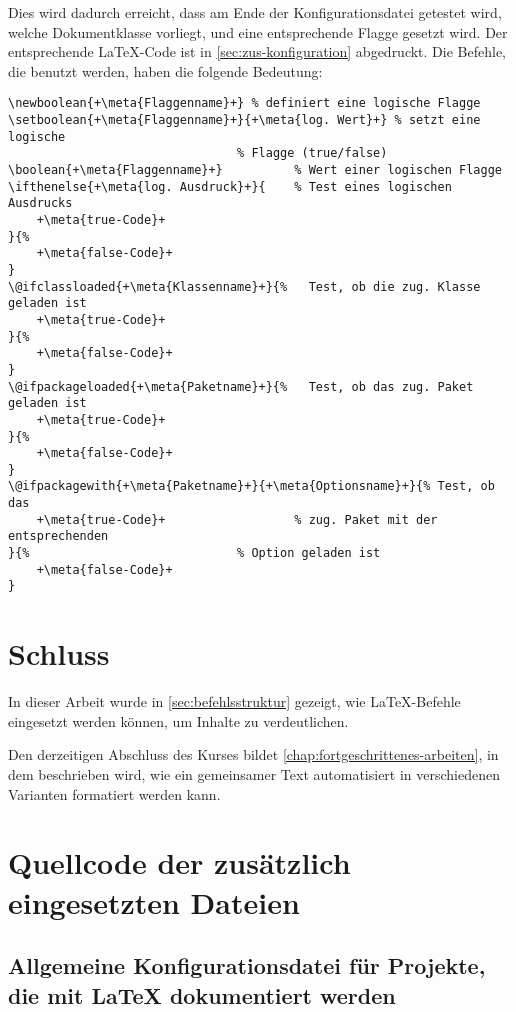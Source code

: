 \documentclass[ngerman,               %
               a4paper,               %
               fleqn,                 %
                     ]{scrartcl}       %
\begin{document}
Dies wird dadurch erreicht, dass am Ende der Konfigurationsdatei getestet
wird, welche Dokumentklasse vorliegt, und eine entsprechende Flagge gesetzt
wird. Der entsprechende \LaTeX-Code ist in \cref{sec:zus-konfiguration}
abgedruckt. Die Befehle, die benutzt werden, haben die folgende Bedeutung:
\begin{lstlisting}[escapechar=+]
\newboolean{+\meta{Flaggenname}+} % definiert eine logische Flagge
\setboolean{+\meta{Flaggenname}+}{+\meta{log. Wert}+} % setzt eine logische
                                % Flagge (true/false)
\boolean{+\meta{Flaggenname}+}          % Wert einer logischen Flagge
\ifthenelse{+\meta{log. Ausdruck}+}{    % Test eines logischen Ausdrucks
    +\meta{true-Code}+
}{%
    +\meta{false-Code}+
}
\@ifclassloaded{+\meta{Klassenname}+}{%   Test, ob die zug. Klasse geladen ist
    +\meta{true-Code}+
}{%
    +\meta{false-Code}+
}
\@ifpackageloaded{+\meta{Paketname}+}{%   Test, ob das zug. Paket geladen ist
    +\meta{true-Code}+
}{%
    +\meta{false-Code}+
}
\@ifpackagewith{+\meta{Paketname}+}{+\meta{Optionsname}+}{% Test, ob das
    +\meta{true-Code}+                  % zug. Paket mit der entsprechenden
}{%                             % Option geladen ist
    +\meta{false-Code}+
}

\end{lstlisting}


\chapter{Schluss}

In dieser Arbeit wurde in \cref{sec:befehlsstruktur} gezeigt, wie
\LaTeX-Befehle eingesetzt werden können, um Inhalte zu verdeutlichen.

Den derzeitigen Abschluss des Kurses bildet
\cref{chap:fortgeschrittenes-arbeiten}, in dem beschrieben wird, wie ein
gemeinsamer Text automatisiert in verschiedenen Varianten formatiert werden
kann.

\appendix

\chapter{Quellcode der zusätzlich eingesetzten Dateien}

\section[Allgemeine Konfigurationsdatei für Projekte]{Allgemeine
   Konfigurationsdatei für Projekte, die mit \LaTeX{}
   dokumentiert werden}%
\label{sec:allg-konfiguration}
\end{document}
